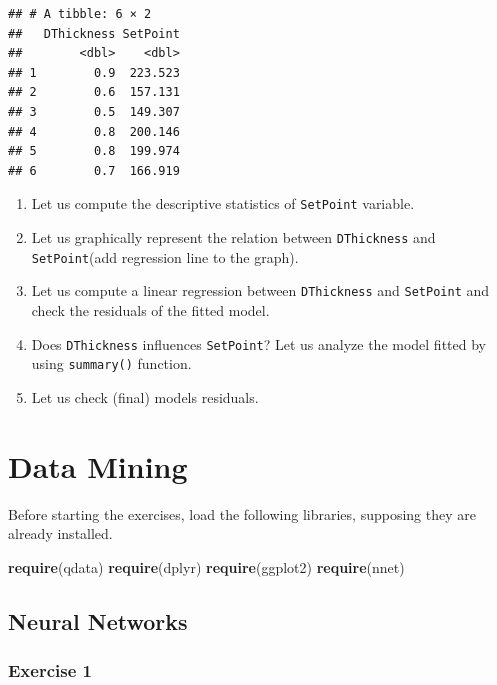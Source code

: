 \documentclass[]{book}
\newenvironment{Shaded}{\begin{snugshade}}{\end{snugshade}}
\newcommand{\KeywordTok}[1]{\textcolor[rgb]{0.13,0.29,0.53}{\textbf{{#1}}}}
\newcommand{\NormalTok}[1]{{#1}}
\begin{document}
\begin{verbatim}
## # A tibble: 6 × 2
##   DThickness SetPoint
##        <dbl>    <dbl>
## 1        0.9  223.523
## 2        0.6  157.131
## 3        0.5  149.307
## 4        0.8  200.146
## 5        0.8  199.974
## 6        0.7  166.919
\end{verbatim}

\begin{enumerate}
\def\labelenumi{\alph{enumi}.}
\item
  Let us compute the descriptive statistics of \texttt{SetPoint}
  variable.
\item
  Let us graphically represent the relation between \texttt{DThickness}
  and \texttt{SetPoint}(add regression line to the graph).
\item
  Let us compute a linear regression between \texttt{DThickness} and
  \texttt{SetPoint} and check the residuals of the fitted model.
\item
  Does \texttt{DThickness} influences \texttt{SetPoint}? Let us analyze
  the model fitted by using \texttt{summary()} function.
\item
  Let us check (final) models residuals.
\end{enumerate}

\chapter{Data Mining}\label{data-mining}

Before starting the exercises, load the following libraries, supposing
they are already installed.

\begin{Shaded}
\begin{Highlighting}[]
\KeywordTok{require}\NormalTok{(qdata)}
\KeywordTok{require}\NormalTok{(dplyr)}
\KeywordTok{require}\NormalTok{(ggplot2)}
\KeywordTok{require}\NormalTok{(nnet)}
\end{Highlighting}
\end{Shaded}

\section{Neural Networks}\label{neural-networks}

\subsection{Exercise 1}\label{exercise-1-19}
\end{document}
